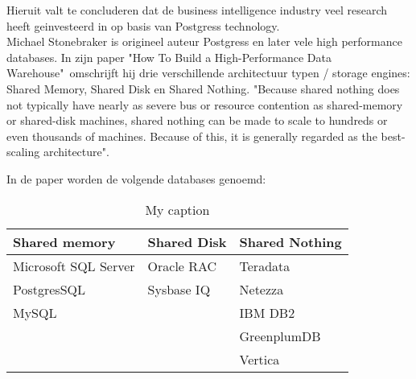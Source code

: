 Hieruit valt te concluderen dat de business intelligence industry veel research heeft geinvesteerd in op basis van Postgress technology. \\

Michael Stonebraker is origineel auteur Postgress en later vele high performance databases. In zijn paper "How To Build a High-Performance Data Warehouse"\  omschrijft hij drie verschillende architectuur typen / storage engines: Shared Memory, Shared Disk en Shared Nothing.
"Because shared nothing does not typically have nearly as severe bus or resource contention as shared-memory or shared-disk machines, shared nothing can be made to scale to hundreds or even thousands
of machines. Because of this, it is generally regarded as the best-scaling architecture". \parencite{dewitt2006build}



In de paper worden de volgende databases genoemd:
\begin{table}[bh]
\centering
\caption{My caption}
\label{my-label}
\begin{tabular}{|l|l|l|}
\hline
\textbf{Shared memory} & \textbf{Shared Disk} & \textbf{Shared Nothing} \\ \hline
Microsoft SQL Server   & Oracle RAC           & Teradata \\
\hline
PostgresSQL            & Sysbase IQ           & Netezza \\
\hline
MySQL                  &                      & IBM DB2 \\
\hline
                       &                      & GreenplumDB \\
\hline
                       &                      & Vertica \\
\hline
\end{tabular}
\end{table}